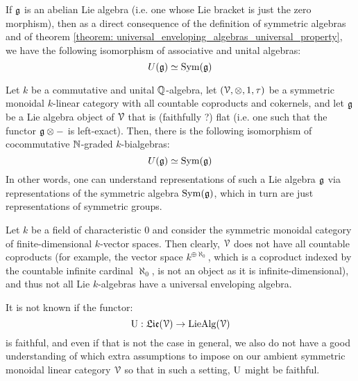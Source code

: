     \begin{example}
        If $\mathfrak{g}$ is an abelian Lie algebra (i.e. one whose Lie bracket is just the zero morphism), then as a direct consequence of the definition of symmetric algebras and of theorem \ref{theorem: universal_enveloping_algebras_universal_property}, we have the following isomorphism of associative and unital algebras:
            $$U(\mathfrak{g}) \simeq \mathrm{Sym}(\mathfrak{g})$$
    \end{example}
    \begin{example}
        Let $k$ be a commutative and unital $\mathbb{Q}$-algebra, let $(\calV, \tensor, 1, \tau)$ be a symmetric monoidal $k$-linear category with all countable coproducts and cokernels, and let $\mathfrak{g}$ be a Lie algebra object of $\mathcal{V}$ that is (faithfully ?) flat (i.e. one such that the functor $\g \tensor -$ is left-exact). Then, there is the following isomorphism of cocommutative $\mathbb{N}$-graded $k$-bialgebras:
            $$U(\mathfrak{g}) \simeq \mathrm{Sym}(\mathfrak{g})$$
        In other words, one can understand representations of such a Lie algebra $\mathfrak{g}$ via representations of the symmetric algebra $\mathrm{Sym}(\mathfrak{g})$, which in turn are just representations of symmetric groups.
    \end{example}
    \begin{example}
        Let $k$ be a field of characteristic $0$ and consider the symmetric monoidal category of finite-dimensional $k$-vector spaces. Then clearly, $\mathcal{V}$ does not have all countable coproducts (for example, the vector space $k^{\oplus \aleph_0}$, which is a coproduct indexed by the countable infinite cardinal $\aleph_0$, is not an object as it is infinite-dimensional), and thus not all Lie $k$-algebras have a universal enveloping algebra.
    \end{example}
    \begin{example}
        It is not known if the functor:
            $$\mathrm{U}: \mathfrak{Lie}(\mathcal{V}) \to \mathrm{Lie}\mathrm{Alg}(\mathcal{V})$$
        is faithful, and even if that is not the case in general, we also do not have a good understanding of which extra assumptions to impose on our ambient symmetric monoidal linear category $\mathcal{V}$ so that in such a setting, $\mathrm{U}$ might be faithful. 
    \end{example}
    
